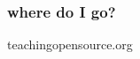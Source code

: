 

\begin{frame} 
\frametitle{where do I go?}
\huge
\begin{center}
teachingopensource.org
\end{center}
\end{frame} 
